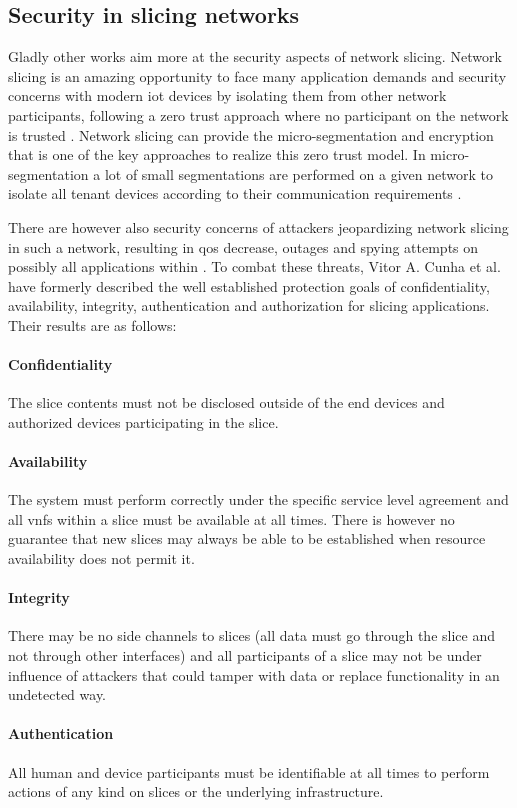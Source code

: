 \subsection{Security in slicing networks}
Gladly other works aim more at the security aspects of network slicing. Network slicing is an amazing opportunity to face many application demands and security concerns with modern \acrshort{iot} devices by isolating them from other network participants, following a zero trust approach where no participant on the network is trusted \cite{zerotrust}. Network slicing can provide the micro-segmentation and encryption that is one of the key approaches to realize this zero trust model. In micro-segmentation a lot of small segmentations are performed on a given network to isolate all tenant devices according to their communication requirements \cite{zerotrust}.

There are however also security concerns of attackers jeopardizing network slicing in such a network, resulting in \acrshort{qos} decrease, outages and spying attempts on possibly all applications within \cite{SE1}. To combat these threats, Vitor A. Cunha et al. \cite{SE1} have formerly described the well established protection goals of confidentiality, availability, integrity, authentication and authorization for slicing applications. Their results are as follows:
\paragraph{Confidentiality} The slice contents must not be disclosed outside of the end devices and authorized devices participating in the slice.
\paragraph{Availability} The system must perform correctly under the specific service level agreement and all \acrshort{vnf}s within a slice must be available at all times. There is however no guarantee that new slices may always be able to be established when resource availability does not permit it.
\paragraph{Integrity} There may be no side channels to slices (all data must go through the slice and not through other interfaces) and all participants of a slice may not be under influence of attackers that could tamper with data or replace functionality in an undetected way.
\paragraph{Authentication} All human and device participants must be identifiable at all times to perform actions of any kind on slices or the underlying infrastructure.
